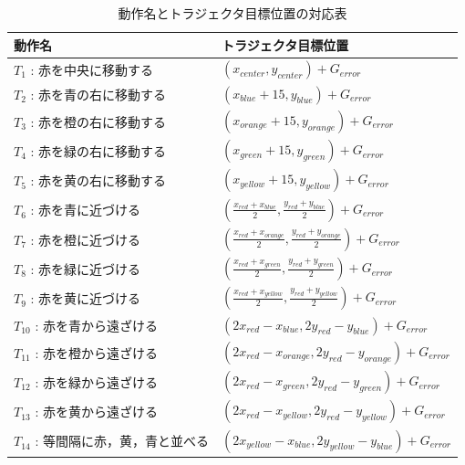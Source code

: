 \begin{table}[h]
	\caption{動作名とトラジェクタ目標位置の対応表}
	\label{table:taskname_15}
  	\begin{tabular}{|l|l|} \hline
    	動作名 & トラジェクタ目標位置\\ \hline
   	$T_{1}$ : 赤を中央に移動する & 
	$
    	\left( x_{center} , y_{center} \right)+G_{error}
    	$
    	\\
    	$T_{2}$ : 赤を青の右に移動する & 
	$
    	\left( x_{blue}+15 , y_{blue} \right)+G_{error}
    	$
    	\\
    	$T_{3}$ : 赤を橙の右に移動する & 
	$
    	\left( x_{orange}+15 , y_{orange} \right)+G_{error}
    	$
    	\\
    	$T_{4}$ : 赤を緑の右に移動する & 
	$
    	\left( x_{green}+15 , y_{green} \right)+G_{error}
    	$
    	\\
    	$T_{5}$ : 赤を黄の右に移動する & 
	$
    	\left( x_{yellow}+15 , y_{yellow} \right)+G_{error}
    	$
    	\\
    	$T_{6}$ : 赤を青に近づける & 
	$
    	\left( \frac{x_{red}+x_{blue}}{2} , \frac{y_{red}+y_{blue}}{2} \right)+G_{error}
    	$
    	\\
    	$T_{7}$ : 赤を橙に近づける & 
	$
    	\left( \frac{x_{red}+x_{orange}}{2} , \frac{y_{red}+y_{orange}}{2} \right)+G_{error}
    	$
    	\\
    	$T_{8}$ : 赤を緑に近づける & 
	$
    	\left( \frac{x_{red}+x_{green}}{2} , \frac{y_{red}+y_{green}}{2} \right)+G_{error}
    	$
    	\\
    	$T_{9}$ : 赤を黄に近づける & 
	$
    	\left( \frac{x_{red}+x_{yellow}}{2} , \frac{y_{red}+y_{yellow}}{2} \right)+G_{error}
    	$
    	\\
    	$T_{10}$ : 赤を青から遠ざける & 
	$
    	\left( 2x_{red}-x_{blue} , 2y_{red}-y_{blue} \right)+G_{error}
    	$
    	\\
    	$T_{11}$ : 赤を橙から遠ざける & 
	$
    	\left( 2x_{red}-x_{orange} , 2y_{red}-y_{orange} \right)+G_{error}
    	$
    	\\
    	$T_{12}$ : 赤を緑から遠ざける & 
	$
    	\left( 2x_{red}-x_{green} , 2y_{red}-y_{green} \right)+G_{error}
    	$
    	\\
    	$T_{13}$ : 赤を黄から遠ざける & 
	$
    	\left( 2x_{red}-x_{yellow} , 2y_{red}-y_{yellow} \right)+G_{error}
    	$
    	\\
    	$T_{14}$ : 等間隔に赤，黄，青と並べる & 
	$
    	\left( 2x_{yellow}-x_{blue} , 2y_{yellow}-y_{blue} \right)+G_{error}
    	$
    	\\

\end{tabular}
\end{table}
